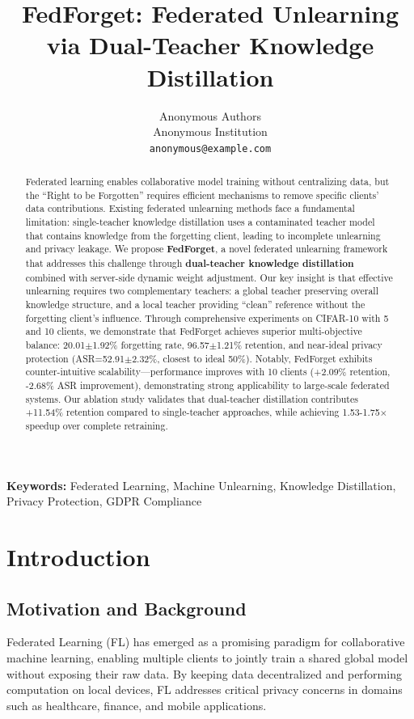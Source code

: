 \documentclass[10pt,twocolumn]{article}
\title{FedForget: Federated Unlearning via Dual-Teacher Knowledge Distillation}
\author{
Anonymous Authors\\
Anonymous Institution\\
\texttt{anonymous@example.com}
}
\date{}
\begin{document}
\maketitle

\begin{abstract}
Federated learning enables collaborative model training without centralizing data, but the ``Right to be Forgotten'' requires efficient mechanisms to remove specific clients' data contributions. Existing federated unlearning methods face a fundamental limitation: single-teacher knowledge distillation uses a contaminated teacher model that contains knowledge from the forgetting client, leading to incomplete unlearning and privacy leakage. We propose \textbf{FedForget}, a novel federated unlearning framework that addresses this challenge through \textbf{dual-teacher knowledge distillation} combined with server-side dynamic weight adjustment. Our key insight is that effective unlearning requires two complementary teachers: a global teacher preserving overall knowledge structure, and a local teacher providing ``clean'' reference without the forgetting client's influence. Through comprehensive experiments on CIFAR-10 with 5 and 10 clients, we demonstrate that FedForget achieves superior multi-objective balance: 20.01$\pm$1.92\% forgetting rate, 96.57$\pm$1.21\% retention, and near-ideal privacy protection (ASR=52.91$\pm$2.32\%, closest to ideal 50\%). Notably, FedForget exhibits counter-intuitive scalability---performance improves with 10 clients (+2.09\% retention, -2.68\% ASR improvement), demonstrating strong applicability to large-scale federated systems. Our ablation study validates that dual-teacher distillation contributes +11.54\% retention compared to single-teacher approaches, while achieving 1.53-1.75$\times$ speedup over complete retraining.
\end{abstract}

\textbf{Keywords:} Federated Learning, Machine Unlearning, Knowledge Distillation, Privacy Protection, GDPR Compliance

\section{Introduction}

\subsection{Motivation and Background}

Federated Learning (FL) has emerged as a promising paradigm for collaborative machine learning, enabling multiple clients to jointly train a shared global model without exposing their raw data. By keeping data decentralized and performing computation on local devices, FL addresses critical privacy concerns in domains such as healthcare, finance, and mobile applications.
\end{document}
